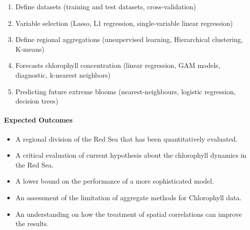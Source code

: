 \begin{enumerate}
  \item Define datasets (training and test datasets, cross-validation)
  \item Variable selection (Lasso, L1 regression, single-variable linear regression)
  \item Define regional aggregations (unsupervised learning, Hierarchical clustering, K-means)
  \item Forecasts chlorophyll concentration (linear regression, GAM models, diagnostic, k-nearest neighbors)
  \item Predicting future extreme blooms (nearest-neighbours, logistic regression, decision trees)
\end{enumerate}

\paragraph{Expected Outcomes}

\begin{itemize}
  \item A regional division of the Red Sea that has been quantitatively evaluated.
  \item A critical evaluation of current hypothesis about the chlorophyll dynamics in the Red Sea.
  \item A lower bound on the performance of a more sophisticated model.
  \item An assessment of the limitation of aggregate methods for Chlorophyll data.
  \item An understanding on how the treatment of spatial correlations can improve the results.
\end{itemize}
